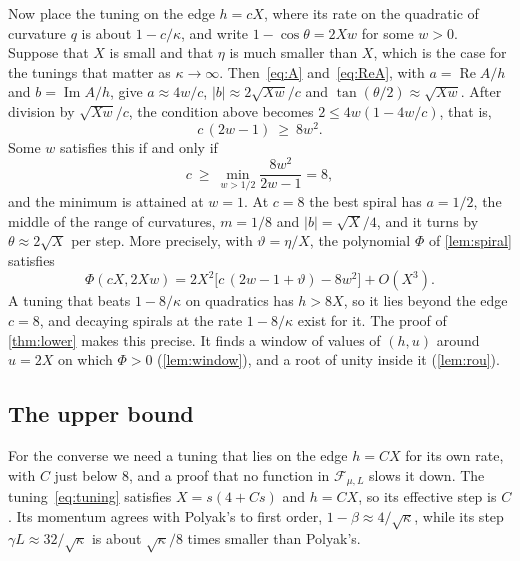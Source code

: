 \documentclass[11pt, a4paper]{article}
\theoremstyle{definition}
\newcommand{\F}{\mathcal{F}_{\mu,L}}
\newcommand{\re}{\operatorname{Re}}
\newcommand{\im}{\operatorname{Im}}
\begin{document}
Now place the tuning on the edge $h=cX$, where its rate on the quadratic of curvature $q$ is about $1-c/\kappa$, and write
$1-\cos\theta=2Xw$ for some $w>0$. Suppose that $X$ is small and that $\eta$ is much smaller than $X$, which is the
case for the tunings that matter as $\kappa\to\infty$. Then~\eqref{eq:A} and~\eqref{eq:ReA}, with $a=\re A/h$ and $b=\im A/h$, give
$a\approx4w/c$, $|b|\approx2\sqrt{Xw}/c$ and $\tan(\theta/2)\approx\sqrt{Xw}$. After division by $\sqrt{Xw}/c$, the condition above
becomes $2\le4w(1-4w/c)$, that is,
\[
  c\,(2w-1)\ \ge\ 8w^2.
\]
Some $w$ satisfies this if and only if
\[
  c\ \ge\ \min_{w>1/2}\frac{8w^2}{2w-1}=8,
\]
and the minimum is attained at $w=1$. At $c=8$ the best spiral has $a=1/2$, the middle of the range of curvatures,
$m=1/8$ and $|b|=\sqrt X/4$, and it turns by $\theta\approx2\sqrt X$ per step. More precisely, with $\vartheta=\eta/X$,
the polynomial $\Phi$ of \cref{lem:spiral} satisfies
\[
  \Phi(cX,2Xw)=2X^2\bigl[c\,(2w-1+\vartheta)-8w^2\bigr]+O(X^3).
\]
A tuning that beats $1-8/\kappa$ on quadratics has $h>8X$, so it lies beyond the edge $c=8$, and decaying spirals at the
rate $1-8/\kappa$ exist for it. The proof of \cref{thm:lower} makes this precise. It finds a window of values of $(h,u)$
around $u=2X$ on which $\Phi>0$ (\cref{lem:window}), and a root of unity inside it (\cref{lem:rou}).

\subsection{The upper bound}
\label{sec:howupper}

For the converse we need a tuning that lies on the edge $h=CX$ for its own rate, with $C$ just below $8$, and a proof
that no function in $\F$ slows it down. The tuning~\eqref{eq:tuning} satisfies $X=s(4+Cs)$ and $h=CX$, so its effective
step is $C$. Its momentum agrees with Polyak's to first order, $1-\beta\approx4/\sqrt\kappa$, while its step
$\gamma L\approx32/\sqrt\kappa$ is about $\sqrt\kappa/8$ times smaller than Polyak's.
\end{document}
